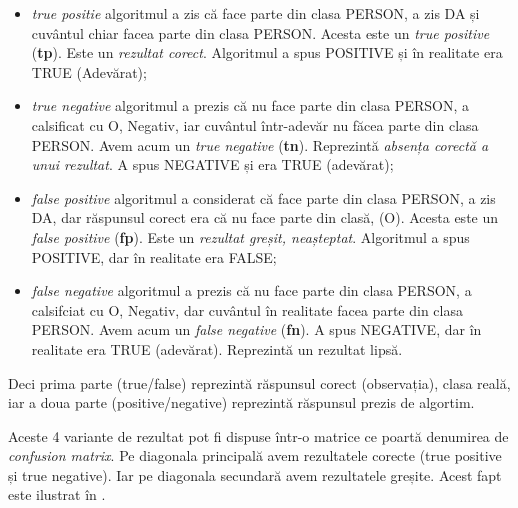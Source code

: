 
\begin{itemize}
\item \textit{true positie} algoritmul a zis că face parte din clasa PERSON, a zis DA și cuvântul chiar facea parte din clasa PERSON. Acesta este un \textit{true positive} (\textbf{tp}). Este un \textit{rezultat corect}. Algoritmul a spus POSITIVE și în realitate era TRUE (Adevărat);

\item \textit{true negative} algoritmul a prezis că nu face parte din clasa PERSON, a calsificat cu O, Negativ, iar cuvântul într-adevăr nu făcea parte din clasa PERSON. Avem acum un \textit{true negative} (\textbf{tn}). Reprezintă \textit{absența corectă a unui rezultat}. A spus NEGATIVE și era TRUE (adevărat);

\item \textit{false positive} algoritmul a considerat că face parte din clasa PERSON, a zis DA, dar răspunsul corect era că nu face parte din clasă, (O). Acesta este un \textit{false positive} (\textbf{fp}). Este un \textit{rezultat greșit, neașteptat}. Algoritmul a spus POSITIVE, dar în realitate era FALSE;

\item \textit{false negative} algoritmul a prezis că nu face parte din clasa PERSON, a calsifciat cu O, Negativ, dar cuvântul în realitate facea parte din clasa PERSON. Avem acum un \textit{false negative} (\textbf{fn}). A spus NEGATIVE, dar în realitate era TRUE (adevărat). Reprezintă un rezultat lipsă.

\end{itemize}

Deci prima parte (true/false) reprezintă răspunsul corect (observația), clasa reală, iar a doua parte (positive/negative) reprezintă răspunsul prezis de algortim.

Aceste 4 variante de rezultat pot fi dispuse într-o matrice ce poartă denumirea de \textit{confusion matrix}. Pe diagonala principală avem rezultatele corecte (true positive și true negative). Iar pe diagonala secundară avem rezultatele greșite. Acest fapt este ilustrat în .


